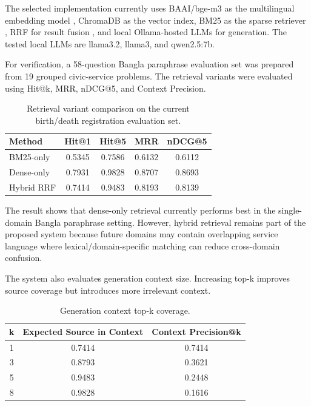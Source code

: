 The selected implementation currently uses BAAI/bge-m3 as the multilingual embedding model \cite{chen2024bgem3}, ChromaDB as the vector index, BM25 as the sparse retriever \cite{robertson2009bm25}, RRF for result fusion \cite{cormack2009rrf}, and local Ollama-hosted LLMs for generation. The tested local LLMs are llama3.2, llama3, and qwen2.5:7b.

For verification, a 58-question Bangla paraphrase evaluation set was prepared from 19 grouped civic-service problems. The retrieval variants were evaluated using Hit@k, MRR, nDCG@5, and Context Precision.

\begin{table}[h]
\centering
\caption{Retrieval variant comparison on the current birth/death registration evaluation set.}
\begin{tabular}{lcccc}
\toprule
\textbf{Method} & \textbf{Hit@1} & \textbf{Hit@5} & \textbf{MRR} & \textbf{nDCG@5} \\
\midrule
BM25-only & 0.5345 & 0.7586 & 0.6132 & 0.6112 \\
Dense-only & 0.7931 & 0.9828 & 0.8707 & 0.8693 \\
Hybrid RRF & 0.7414 & 0.9483 & 0.8193 & 0.8139 \\
\bottomrule
\end{tabular}
\end{table}

The result shows that dense-only retrieval currently performs best in the single-domain Bangla paraphrase setting. However, hybrid retrieval remains part of the proposed system because future domains may contain overlapping service language where lexical/domain-specific matching can reduce cross-domain confusion.

The system also evaluates generation context size. Increasing top-k improves source coverage but introduces more irrelevant context.

\begin{table}[h]
\centering
\caption{Generation context top-k coverage.}
\begin{tabular}{ccc}
\toprule
\textbf{k} & \textbf{Expected Source in Context} & \textbf{Context Precision@k} \\
\midrule
1 & 0.7414 & 0.7414 \\
3 & 0.8793 & 0.3621 \\
5 & 0.9483 & 0.2448 \\
8 & 0.9828 & 0.1616 \\
\bottomrule
\end{tabular}
\end{table}

